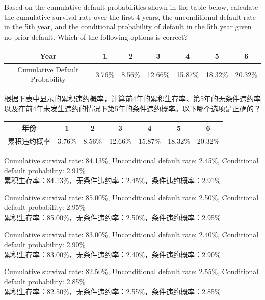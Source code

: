 \documentclass{article}
\newcounter{question} %
\begin{document}
            \begin{question}
                Based on the cumulative default probabilities shown in the table below, calculate the cumulative survival rate over the first 4 years, the unconditional default rate in the 5th year, and the conditional probability of default in the 5th year given no prior default. Which of the following options is correct?
            
                \begin{table}[H]
                \centering
                \begin{tabular}{|c|c|c|c|c|c|c|}
                \hline
                Year & 1 & 2 & 3 & 4 & 5 & 6 \\
                \hline
                Cumulative Default Probability & 3.76\% & 8.56\% & 12.66\% & 15.87\% & 18.32\% & 20.32\% \\
                \hline
                \end{tabular}
                \end{table}
                根据下表中显示的累积违约概率，计算前4年的累积生存率、第5年的无条件违约率以及在前4年未发生违约的情况下第5年的条件违约概率。以下哪个选项是正确的？
            
                \begin{table}[h]
                \centering
                \begin{tabular}{|c|c|c|c|c|c|c|}
                \hline
                年份 & 1 & 2 & 3 & 4 & 5 & 6 \\
                \hline
                累积违约概率 & 3.76\% & 8.56\% & 12.66\% & 15.87\% & 18.32\% & 20.32\% \\
                \hline
                \end{tabular}
                \end{table}
            \end{question}
            
            \begin{choices}
                \item Cumulative survival rate: 84.13\%, Unconditional default rate: 2.45\%, Conditional default probability: 2.91\% \\
                累积生存率：84.13\%，无条件违约率：2.45\%，条件违约概率：2.91\%
                \item Cumulative survival rate: 85.00\%, Unconditional default rate: 2.50\%, Conditional default probability: 2.95\% \\
                累积生存率：85.00\%，无条件违约率：2.50\%，条件违约概率：2.95\%
                \item Cumulative survival rate: 83.00\%, Unconditional default rate: 2.40\%, Conditional default probability: 2.90\% \\
                累积生存率：83.00\%，无条件违约率：2.40\%，条件违约概率：2.90\%
                \item Cumulative survival rate: 82.50\%, Unconditional default rate: 2.55\%, Conditional default probability: 2.85\% \\
                累积生存率：82.50\%，无条件违约率：2.55\%，条件违约概率：2.85\%
            \end{choices}
            
\end{document}
